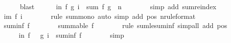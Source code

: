 \begin{isabellebody}
\ \ \ \ \ \ \isamarkupfalse%
\ blast\isanewline
\isanewline
\ \ \ \ \isamarkupfalse%
\ {\isachardoublequoteopen}{\isacharparenleft}{\kern0pt}{\isasymSum}i{\isacharless}{\kern0pt}n{\isachardot}{\kern0pt}\ f\ {\isacharparenleft}{\kern0pt}g\ i{\isacharparenright}{\kern0pt}{\isacharparenright}{\kern0pt}\ {\isacharequal}{\kern0pt}\ sum\ f\ {\isacharparenleft}{\kern0pt}g\ {\isacharbackquote}{\kern0pt}\ {\isacharbraceleft}{\kern0pt}{\isachardot}{\kern0pt}{\isachardot}{\kern0pt}{\isacharless}{\kern0pt}n{\isacharbraceright}{\kern0pt}{\isacharparenright}{\kern0pt}{\isachardoublequoteclose}\isanewline
\ \ \ \ \ \ \isamarkupfalse%
\ {\isacharparenleft}{\kern0pt}simp\ add{\isacharcolon}{\kern0pt}\ sum{\isachardot}{\kern0pt}reindex{\isacharparenright}{\kern0pt}\isanewline
\ \ \ \ \isamarkupfalse%
\ \isamarkupfalse%
\ {\isachardoublequoteopen}{\isasymdots}\ {\isasymle}\ {\isacharparenleft}{\kern0pt}{\isasymSum}i{\isacharless}{\kern0pt}m{\isachardot}{\kern0pt}\ f\ i{\isacharparenright}{\kern0pt}{\isachardoublequoteclose}\isanewline
\ \ \ \ \ \ \isamarkupfalse%
\ {\isacharparenleft}{\kern0pt}rule\ sum{\isacharunderscore}{\kern0pt}mono{}{\isacharparenright}{\kern0pt}\ {\isacharparenleft}{\kern0pt}auto\ simp\ add{\isacharcolon}{\kern0pt}\ pos\ n{\isacharbrackleft}{\kern0pt}rule{\isacharunderscore}{\kern0pt}format{\isacharbrackright}{\kern0pt}{\isacharparenright}{\kern0pt}\isanewline
\ \ \ \ \isamarkupfalse%
\ \isamarkupfalse%
\ {\isachardoublequoteopen}{\isasymdots}\ {\isasymle}\ suminf\ f{\isachardoublequoteclose}\isanewline
\ \ \ \ \ \ \isamarkupfalse%
\ {\isacartoucheopen}summable\ f{\isacartoucheclose}\isanewline
\ \ \ \ \ \ \isamarkupfalse%
\ {\isacharparenleft}{\kern0pt}rule\ sum{\isacharunderscore}{\kern0pt}le{\isacharunderscore}{\kern0pt}suminf{\isacharparenright}{\kern0pt}\ {\isacharparenleft}{\kern0pt}simp{\isacharunderscore}{\kern0pt}all\ add{\isacharcolon}{\kern0pt}\ pos{\isacharparenright}{\kern0pt}\isanewline
\ \ \ \ \isamarkupfalse%
\ \isamarkupfalse%
\ {\isachardoublequoteopen}{\isacharparenleft}{\kern0pt}{\isasymSum}i{\isacharless}{\kern0pt}n{\isachardot}{\kern0pt}\ {\isacharparenleft}{\kern0pt}f\ {\isasymcirc}\ \ g{\isacharparenright}{\kern0pt}\ i{\isacharparenright}{\kern0pt}\ {\isasymle}\ suminf\ f{\isachardoublequoteclose}\isanewline
\ \ \ \ \ \ \isamarkupfalse%
\ simp\isanewline
\ \ \isamarkupfalse%
\isanewline
\isanewline

\end{isabellebody}
